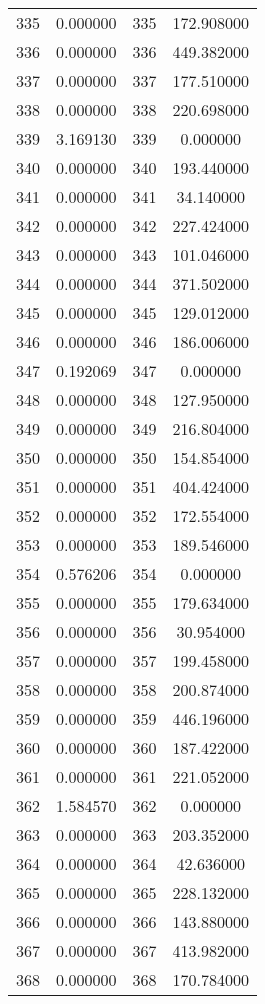 \documentclass[12pt]{article}
\begin{document}
\begin{longtable}{@{}cccc@{}}
335 & 0.000000 & 335 & 172.908000 \\
336 & 0.000000 & 336 & 449.382000 \\
337 & 0.000000 & 337 & 177.510000 \\
338 & 0.000000 & 338 & 220.698000 \\
339 & 3.169130 & 339 & 0.000000 \\
340 & 0.000000 & 340 & 193.440000 \\
341 & 0.000000 & 341 & 34.140000 \\
342 & 0.000000 & 342 & 227.424000 \\
343 & 0.000000 & 343 & 101.046000 \\
344 & 0.000000 & 344 & 371.502000 \\
345 & 0.000000 & 345 & 129.012000 \\
346 & 0.000000 & 346 & 186.006000 \\
347 & 0.192069 & 347 & 0.000000 \\
348 & 0.000000 & 348 & 127.950000 \\
349 & 0.000000 & 349 & 216.804000 \\
350 & 0.000000 & 350 & 154.854000 \\
351 & 0.000000 & 351 & 404.424000 \\
352 & 0.000000 & 352 & 172.554000 \\
353 & 0.000000 & 353 & 189.546000 \\
354 & 0.576206 & 354 & 0.000000 \\
355 & 0.000000 & 355 & 179.634000 \\
356 & 0.000000 & 356 & 30.954000 \\
357 & 0.000000 & 357 & 199.458000 \\
358 & 0.000000 & 358 & 200.874000 \\
359 & 0.000000 & 359 & 446.196000 \\
360 & 0.000000 & 360 & 187.422000 \\
361 & 0.000000 & 361 & 221.052000 \\
362 & 1.584570 & 362 & 0.000000 \\
363 & 0.000000 & 363 & 203.352000 \\
364 & 0.000000 & 364 & 42.636000 \\
365 & 0.000000 & 365 & 228.132000 \\
366 & 0.000000 & 366 & 143.880000 \\
367 & 0.000000 & 367 & 413.982000 \\
368 & 0.000000 & 368 & 170.784000 \\

\end{longtable}
\end{document}
